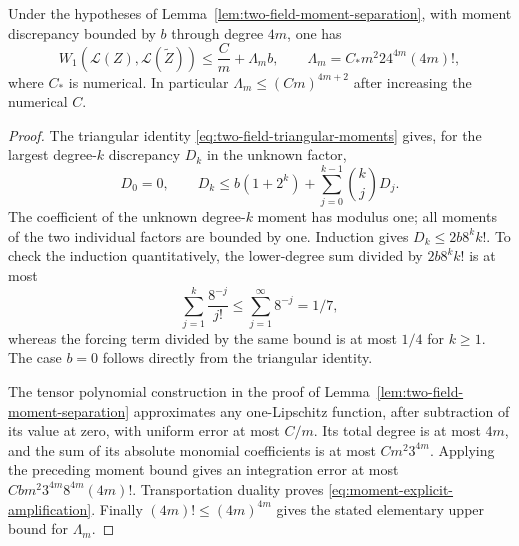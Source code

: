 \begin{lemma}
\label{lem:moment-explicit-conditioning}
Under the hypotheses of Lemma~\ref{lem:two-field-moment-separation},
with moment discrepancy bounded by $b$ through degree $4m$, one has
\begin{equation}\label{eq:moment-explicit-amplification}
 W_1(\mathcal L(Z),\mathcal L(\widetilde Z))
       \le \frac{C}{m}+\Lambda_m b,
 \qquad
 \Lambda_m=C_*m^2 24^{4m}(4m)!,
\end{equation}
where $C_*$ is numerical.  In particular
$\Lambda_m\le(Cm)^{4m+2}$ after increasing the numerical $C$.
\end{lemma}
\begin{proof}
The triangular identity
\eqref{eq:two-field-triangular-moments} gives, for the largest
degree-$k$ discrepancy $D_k$ in the unknown factor,
\[
 D_0=0,\qquad
 D_k\le b(1+2^k)+\sum_{j=0}^{k-1}\binom{k}{j}D_j.
\]
The coefficient of the unknown degree-$k$ moment has modulus one;
all moments of the two individual factors are bounded by one.
Induction gives $D_k\le2b8^k k!$.  To check the induction
quantitatively, the lower-degree sum divided by $2b8^k k!$ is
at most
\[
 \sum_{j=1}^k\frac{8^{-j}}{j!}
            \le\sum_{j=1}^\infty8^{-j}=1/7,
\]
whereas the forcing term divided by the same bound is at most
$1/4$ for $k\ge1$.  The case $b=0$ follows directly from the
triangular identity.

The tensor polynomial construction in the proof of
Lemma~\ref{lem:two-field-moment-separation} approximates any
one-Lipschitz function, after subtraction of its value at zero,
with uniform error at most $C/m$.  Its total degree is at most
$4m$, and the sum of its absolute monomial coefficients is at
most $Cm^2 3^{4m}$.  Applying the preceding moment bound gives
an integration error at most
$Cb m^2 3^{4m}8^{4m}(4m)!$.  Transportation duality proves
\eqref{eq:moment-explicit-amplification}.  Finally
$(4m)!\le(4m)^{4m}$ gives the stated elementary upper bound for
$\Lambda_m$.
\end{proof}

